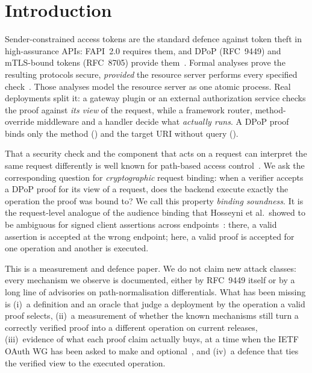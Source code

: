 \section{Introduction}\label{sec:intro}

Sender-constrained access tokens are the standard defence against token theft
in high-assurance APIs: FAPI~2.0 requires them, and DPoP (RFC~9449) and
mTLS-bound tokens (RFC~8705) provide them~\cite{rfc9449,rfc8705,fapisp2025}.
Formal analyses prove the resulting protocols secure, \emph{provided} the
resource server performs every specified
check~\cite{hosseyni2024csf,hosseyni2024tops}. Those analyses model the
resource server as one atomic process. Real deployments split it: a gateway
plugin or an external authorization service checks the proof against
\emph{its view} of the request, while a framework router, method-override
middleware and a handler decide what \emph{actually runs}. A DPoP proof binds
only the method (\htm) and the target URI without query (\htu).

That a security check and the component that acts on a request can interpret
the same request differently is well known for path-based access
control~\cite{p2:tsai2018breaking,p2:xvnpw2021kong,p2:zhang2025uabscan}.
We ask the corresponding question for \emph{cryptographic} request binding:
when a verifier accepts a DPoP proof for its view of a request, does the
backend execute exactly the operation the proof was bound to? We call this
property \emph{binding soundness}. It is the request-level analogue of the
audience binding that Hosseyni et al.\ showed to be ambiguous for signed
client assertions across endpoints~\cite{p2:hosseyni2026audience}: there, a
valid assertion is accepted at the wrong endpoint; here, a valid proof is
accepted for one operation and another is executed.

This is a measurement and defence paper. We do not claim new attack classes:
every mechanism we observe is documented, either by RFC~9449 itself or by a
long line of advisories on path-normalisation differentials. What has been
missing is (i)~a definition and an oracle that judge a deployment by the
operation a valid proof selects, (ii)~a measurement of whether the known
mechanisms still turn a correctly verified proof into a different operation
on current releases, (iii)~evidence of what each proof claim actually buys,
at a time when the IETF OAuth WG has been asked to make \htm and \htu
optional~\cite{allam2026thread}, and (iv)~a defence that ties the verified
view to the executed operation.

